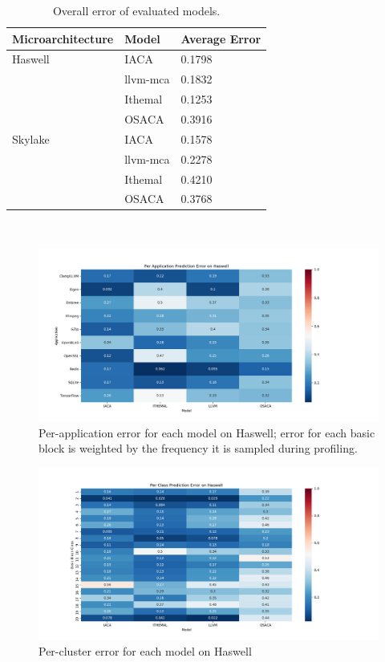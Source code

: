\begin{table}
\begin{tabular}{|p{}|p{}|p{}|}
\hline

Microarchitecture & Model & Average Error\\
\hline

Haswell & IACA & 0.1798\\
    & llvm-mca & 0.1832\\
    & Ithemal & 0.1253\\
    & OSACA & 0.3916\\
    
\hline 
Skylake & IACA & 0.1578\\
    & llvm-mca & 0.2278\\
    & Ithemal & 0.4210\\
    & OSACA & 0.3768\\

\hline
\end{tabular}
\\
\caption{Overall error of evaluated models.}
\label{tab:overall}
\end{table}

\begin{figure}
\includegraphics[width=\columnwidth]{figures/hsw-app-err.png}
\caption{Per-application error for each model on Haswell;
error for each basic block is weighted by the frequency it is sampled during profiling.}
\label{fig:hsw-app-err}
\end{figure}

\begin{figure}
\includegraphics[width=\columnwidth]{figures/hsw-cluster-err.png}
\caption{Per-cluster error for each model on Haswell}
\label{fig:hsw-cluster-err}
\end{figure}

